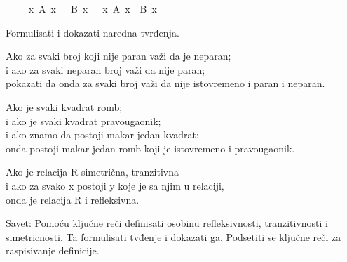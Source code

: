 \begin{isabellebody}
\begin{exercise}[subtitle=Dokazi u prirodnoj dedukciji]
\ \ %
\isadelimproof
%
\endisadelimproof
%
\isatagproof
%
\endisatagproof
{\isafoldproof}%
%
\isadelimproof
%
\endisadelimproof
\isanewline
{}\isamarkupfalse%
\ {\isachardoublequoteopen}{\isacharparenleft}{\kern0pt}{\isasymforall}\ x{\isachardot}{\kern0pt}\ A\ x\ {\isasymlongrightarrow}\ {\isasymnot}\ B\ x{\isacharparenright}{\kern0pt}\ {\isasymlongrightarrow}\ {\isacharparenleft}{\kern0pt}{\isasymnexists}\ x{\isachardot}{\kern0pt}\ A\ x\ {\isasymand}\ B\ x{\isacharparenright}{\kern0pt}{\isachardoublequoteclose}\isanewline
\ \ %
\isadelimproof
%
\endisadelimproof
%
\isatagproof
%
\endisatagproof
{\isafoldproof}%
%
\isadelimproof
%
\endisadelimproof
%
\begin{isamarkuptext}%
Formulisati i dokazati naredna tvrđenja.%
\end{isamarkuptext}\isamarkuptrue%
%
\begin{isamarkuptext}%
Ako za svaki broj koji nije paran važi da je neparan;\\
      i ako za svaki neparan broj važi da nije paran;\\
      pokazati da onda za svaki broj važi da nije istovremeno i paran i neparan.%
\end{isamarkuptext}\isamarkuptrue%
%
\begin{isamarkuptext}%
Ako je svaki kvadrat romb;\\
      i ako je svaki kvadrat pravougaonik;\\
      i ako znamo da postoji makar jedan kvadrat;\\
      onda postoji makar jedan romb koji je istovremeno i pravougaonik.%
\end{isamarkuptext}\isamarkuptrue%
%
\begin{isamarkuptext}%
Ako je relacija R simetrična, tranzitivna\\
      i ako za svako x postoji y koje je sa njim u relaciji,\\ 
      onda je relacija R i refleksivna.%
\end{isamarkuptext}\isamarkuptrue%
%
\begin{isamarkuptext}%
Savet: Pomoću ključne reči  definisati osobinu refleksivnosti,
      tranzitivnosti i simetricnosti. Ta formulisati tvđenje i dokazati ga.
      Podsetiti se ključne reči  za raspisivanje definicije.%
\end{isamarkuptext}\isamarkuptrue%
%
\end{exercise}
%
\begin{exercise}[subtitle=Klasična pravilo prirodne dedukcije: ccontr.]

\end{exercise}
\end{isabellebody}
